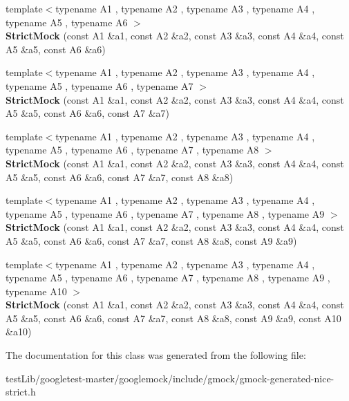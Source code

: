 \begin{DoxyCompactItemize}
\item 
\mbox{\label{classtesting_1_1StrictMock_a17b452e1e2f57d7d10f7209587376eef}} 
{\footnotesize template$<$typename A1 , typename A2 , typename A3 , typename A4 , typename A5 , typename A6 $>$ }\\{\bfseries Strict\+Mock} (const A1 \&a1, const A2 \&a2, const A3 \&a3, const A4 \&a4, const A5 \&a5, const A6 \&a6)
\item 
\mbox{\label{classtesting_1_1StrictMock_a4af48752fc22815250369292b9c064bc}} 
{\footnotesize template$<$typename A1 , typename A2 , typename A3 , typename A4 , typename A5 , typename A6 , typename A7 $>$ }\\{\bfseries Strict\+Mock} (const A1 \&a1, const A2 \&a2, const A3 \&a3, const A4 \&a4, const A5 \&a5, const A6 \&a6, const A7 \&a7)
\item 
\mbox{\label{classtesting_1_1StrictMock_aac6eaaad3e94491ada7bb43ee6149775}} 
{\footnotesize template$<$typename A1 , typename A2 , typename A3 , typename A4 , typename A5 , typename A6 , typename A7 , typename A8 $>$ }\\{\bfseries Strict\+Mock} (const A1 \&a1, const A2 \&a2, const A3 \&a3, const A4 \&a4, const A5 \&a5, const A6 \&a6, const A7 \&a7, const A8 \&a8)
\item 
\mbox{\label{classtesting_1_1StrictMock_a4129f247ae087d586fdb04f450422d3e}} 
{\footnotesize template$<$typename A1 , typename A2 , typename A3 , typename A4 , typename A5 , typename A6 , typename A7 , typename A8 , typename A9 $>$ }\\{\bfseries Strict\+Mock} (const A1 \&a1, const A2 \&a2, const A3 \&a3, const A4 \&a4, const A5 \&a5, const A6 \&a6, const A7 \&a7, const A8 \&a8, const A9 \&a9)
\item 
\mbox{\label{classtesting_1_1StrictMock_a4936b0a5622b39e974deae12ecb1430b}} 
{\footnotesize template$<$typename A1 , typename A2 , typename A3 , typename A4 , typename A5 , typename A6 , typename A7 , typename A8 , typename A9 , typename A10 $>$ }\\{\bfseries Strict\+Mock} (const A1 \&a1, const A2 \&a2, const A3 \&a3, const A4 \&a4, const A5 \&a5, const A6 \&a6, const A7 \&a7, const A8 \&a8, const A9 \&a9, const A10 \&a10)
\end{DoxyCompactItemize}


The documentation for this class was generated from the following file\+:\begin{DoxyCompactItemize}
\item 
test\+Lib/googletest-\/master/googlemock/include/gmock/gmock-\/generated-\/nice-\/strict.\+h\end{DoxyCompactItemize}
